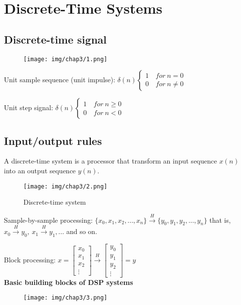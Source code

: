 \section{Discrete-Time Systems}
\subsection{Discrete-time signal}
\begin{figure}[h!]
    \centering
    \texttt{[image: img/chap3/1.png]}
\end{figure}

Unit sample sequence (unit impulse): $\displaystyle \delta(n) \begin{cases}
    1 \quad for\ n=0 \\
    0 \quad for\ n\neq 0
\end{cases} $

Unit step signal: $\displaystyle \delta(n) \begin{cases}
    1 \quad for\ n\geq 0 \\
    0 \quad for\ n< 0
\end{cases} $
\subsection{Input/output rules}
A discrete-time system is a processor that transform an input sequence $x(n)$ into an output sequence $y(n)$.
\begin{figure}[h!]
    \centering
    \texttt{[image: img/chap3/2.png]}
    \caption{Discrete-time system}
\end{figure}

Sample-by-sample processing: $\{x_0,x_1,x_2,...,x_n\} \xrightarrow{H} \{y_0,y_1,y_2,...,y_n\}$ that is, $x_0 \xrightarrow{H}y_0, \ x_1 \xrightarrow{H} y_1,...$ and so on.

Block processing: $x = \begin{bmatrix}
    x_0 \\
    x_1 \\ 
    x_2 \\
    \vdots 
\end{bmatrix} \xrightarrow{H} \begin{bmatrix}
    y_0 \\
    y_1 \\ 
    y_2 \\
    \vdots 
\end{bmatrix}=y$\\
\newpage
\textbf{Basic building blocks of DSP systems}
\begin{figure}[h!]
    \centering
    \texttt{[image: img/chap3/3.png]}
\end{figure}

